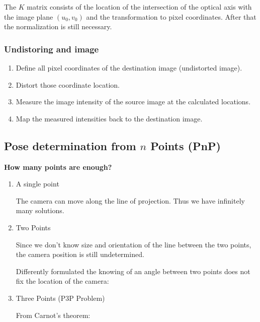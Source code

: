 \documentclass[10pt,a4paper]{scrartcl}
\begin{document}
\begin{multicols*}{2}
\begin{enumerate}
The $K$ matrix consists of the location of the intersection of the optical axis with the image plane $(u_0,v_0)$ and the transformation to pixel coordinates. After that the normalization is still necessary.
\end{enumerate}

\subsubsection{Undistoring and image}

\begin{enumerate}
\item Define all pixel coordinates of the destination image (undistorted image).
\item Distort those coordinate location.
\item Measure the image intensity of the source image at the calculated locations.
\item Map the measured intensities back to the destination image.
\end{enumerate}

\subsection{Pose determination from $n$ Points (PnP)}

\textbf{How many points are enough?}

\begin{enumerate}
\item A single point


The camera can move along the line of projection. Thus we have infinitely many solutions.

\item Two Points


Since we don't know size and orientation of the line between the two points, the camera position is still undetermined.

Differently formulated the knowing of an angle between two points does not fix the location of the camera:


\item Three Points (P3P Problem)


From Carnot's theorem:


\end{enumerate}
\end{multicols*}
\end{document}
